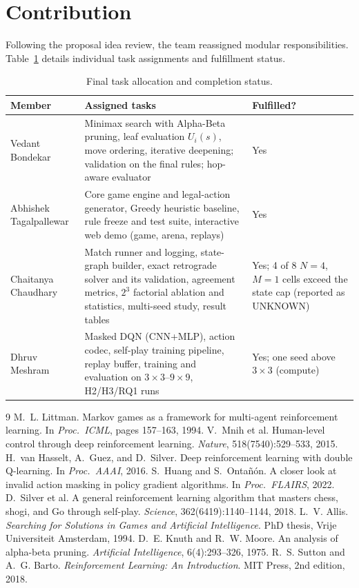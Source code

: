 \documentclass[10pt]{article}
\begin{document}
\section{Contribution}\label{sec:contribution}
Following the proposal idea review, the team reassigned modular responsibilities. Table~\ref{tab:contrib} details individual task assignments and fulfillment status.

\begin{table}[!htb]
\centering\footnotesize
\caption{Final task allocation and completion status.}
\label{tab:contrib}
\begin{tabularx}{\textwidth}{>{\raggedright\arraybackslash}p{3.3cm}>{\raggedright\arraybackslash}X>{\raggedright\arraybackslash}p{3.8cm}}
\toprule
Member & Assigned tasks & Fulfilled?\\
\midrule
Vedant Bondekar & Minimax search with Alpha-Beta pruning, leaf evaluation $U_i(s)$, move ordering, iterative deepening; validation on the final rules; hop-aware evaluator & Yes\\
Abhishek Tagalpallewar & Core game engine and legal-action generator, Greedy heuristic baseline, rule freeze and test suite, interactive web demo (game, arena, replays) & Yes\\
Chaitanya Chaudhary & Match runner and logging, state-graph builder, exact retrograde solver and its validation, agreement metrics, $2^3$ factorial ablation and statistics, multi-seed study, result tables & Yes; 4 of 8 $N=4$, $M=1$ cells exceed the state cap (reported as UNKNOWN)\\
Dhruv Meshram & Masked DQN (CNN+MLP), action codec, self-play training pipeline, replay buffer, training and evaluation on $3\times3$--$9\times9$, H2/H3/RQ1 runs & Yes; one seed above $3\times3$ (compute)\\
\bottomrule
\end{tabularx}
\end{table}

\begin{thebibliography}{9}\footnotesize\setlength{\itemsep}{0pt}\setlength{\parskip}{0pt}
 M.~L. Littman. Markov games as a framework for multi-agent reinforcement learning. In \emph{Proc.\ ICML}, pages 157--163, 1994.
 V.~Mnih et al. Human-level control through deep reinforcement learning. \emph{Nature}, 518(7540):529--533, 2015.
 H.~van Hasselt, A.~Guez, and D.~Silver. Deep reinforcement learning with double Q-learning. In \emph{Proc.\ AAAI}, 2016.
 S.~Huang and S.~Onta\~n\'on. A closer look at invalid action masking in policy gradient algorithms. In \emph{Proc.\ FLAIRS}, 2022.
 D.~Silver et al. A general reinforcement learning algorithm that masters chess, shogi, and Go through self-play. \emph{Science}, 362(6419):1140--1144, 2018.
 L.~V. Allis. \emph{Searching for Solutions in Games and Artificial Intelligence}. PhD thesis, Vrije Universiteit Amsterdam, 1994.
 D.~E. Knuth and R.~W. Moore. An analysis of alpha-beta pruning. \emph{Artificial Intelligence}, 6(4):293--326, 1975.
 R.~S. Sutton and A.~G. Barto. \emph{Reinforcement Learning: An Introduction}. MIT Press, 2nd edition, 2018.
\end{thebibliography}
\end{document}
